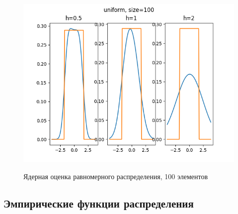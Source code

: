 \documentclass[12pt,a4paper]{article}
\begin{document}
			\begin{figure}[htp]
				{\includegraphics[width=1\linewidth]{../plots/uniform_100.png}}
				\caption{Ядерная оценка равномерного распределения, 100 элементов}
			\end{figure}
			
			\newpage
			\subsection{Эмпирические функции распределения}
			
\end{document}
